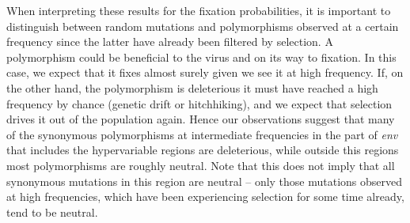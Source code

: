 \documentclass[rmp, twocolumn]{revtex4}
\newcommand{\env}{\textit{env}}
\begin{document}
When interpreting these results for the fixation probabilities, it is important
to distinguish between random mutations and polymorphisms observed at a certain
frequency since the latter have already been filtered by selection.
A polymorphism could be beneficial to the virus and on its way to fixation. In
this case, we expect that it fixes almost surely given we see it at high
frequency. If, on the other hand, the polymorphism is deleterious it must have
reached a high frequency by chance (genetic drift or hitchhiking), and
we expect that selection drives it out of the population again. Hence our
observations suggest that many of the synonymous polymorphisms at intermediate
frequencies in the part of \env{} that includes the hypervariable regions are
deleterious, while outside this regions most polymorphisms are roughly
neutral. Note that this does not imply that all synonymous mutations in this
region are neutral -- only those mutations observed at high frequencies, which
have been experiencing selection for some time already, tend to be neutral.
\end{document}

